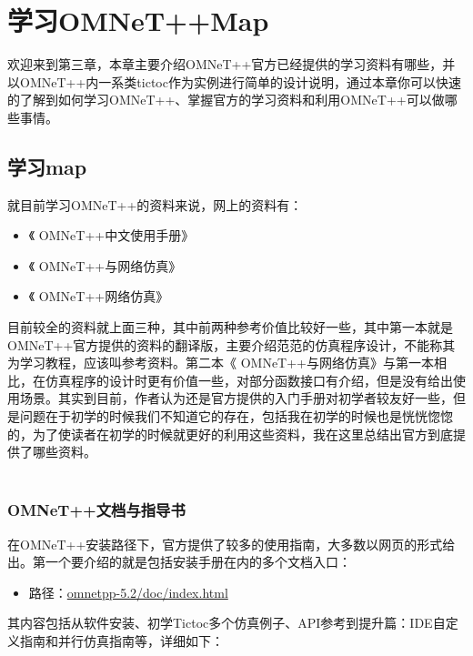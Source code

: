 \chapter{学习OMNeT++Map}

\begin{summary}
欢迎来到第三章，本章主要介绍OMNeT++官方已经提供的学习资料有哪些，并以OMNeT++内一系类tictoc作为实例进行简单的设计说明，通过本章你可以快速的了解到如何学习OMNeT++、掌握官方的学习资料和利用OMNeT++可以做哪些事情。\\
\end{summary}

\section{学习map}
就目前学习OMNeT++的资料来说，网上的资料有：
\begin{itemize}
	\item 《 OMNeT++中文使用手册》
	\item 《 OMNeT++与网络仿真》
	\item 《 OMNeT++网络仿真》 
\end{itemize}

目前较全的资料就上面三种，其中前两种参考价值比较好一些，其中第一本就是OMNeT++官方提供的资料的翻译版，主要介绍范范的仿真程序设计，不能称其为学习教程，应该叫参考资料。第二本《 OMNeT++与网络仿真》与第一本相比，在仿真程序的设计时更有价值一些，对部分函数接口有介绍，但是没有给出使用场景。其实到目前，作者认为还是官方提供的入门手册对初学者较友好一些，但是问题在于初学的时候我们不知道它的存在，包括我在初学的时候也是恍恍惚惚的，为了使读者在初学的时候就更好的利用这些资料，我在这里总结出官方到底提供了哪些资料。\\ \\

\subsection{OMNeT++文档与指导书}
在OMNeT++安装路径下，官方提供了较多的使用指南，大多数以网页的形式给出。第一个要介绍的就是包括安装手册在内的多个文档入口：

\begin{itemize}
\item 路径：\url{omnetpp-5.2/doc/index.html}
\end{itemize}

其内容包括从软件安装、初学Tictoc多个仿真例子、API参考到提升篇：IDE自定义指南和并行仿真指南等，详细如下：\\

